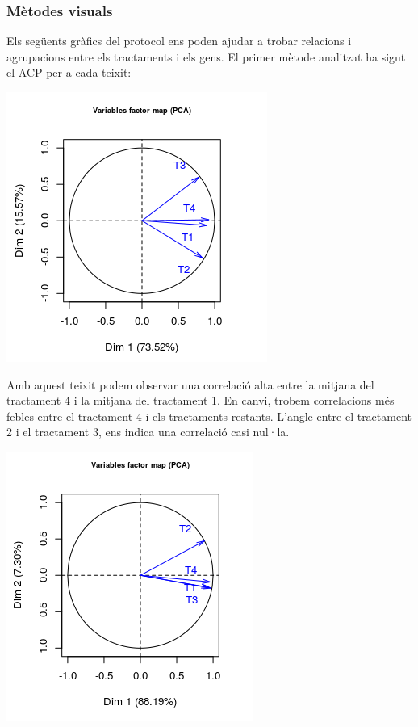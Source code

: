 \documentclass[english]{article}
\begin{document}
\subsubsection{Mètodes visuals}
Els següents gràfics del protocol ens poden ajudar a trobar relacions i agrupacions entre els tractaments i els gens. El primer mètode analitzat ha sigut el ACP per a cada teixit:
\begin{center}
\includegraphics[scale=0.4]{biploti.png}
\end{center}
Amb aquest teixit podem observar una correlació alta entre la mitjana del tractament 4 i la mitjana del tractament 1. En canvi, trobem correlacions més febles entre el tractament 4 i els tractaments restants. L'angle entre el tractament 2 i el tractament 3, ens indica una correlació casi nul·la.
\begin{center}
\includegraphics[scale=0.4]{biplotj.png}
\end{center}
\end{document}

